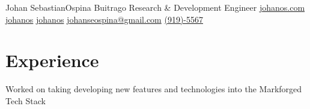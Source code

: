 \documentclass[]{plushcv}
\begin{document}
%
%

\namesection
{Johan Sebastian}{Ospina Buitrago}
{Research \& Development Engineer}
{
    \contactline
    {\href{https://www.johanos.com}{johanos.com}}
    {\href{https://www.github.com/johanos}{johanos}}
    {\href{https://www.linkedin.com/in/johanos}
        {johanos}}
    {\href{mailto:johanseospina@gmail.com}{johanseospina@gmail.com}}
    {\href{tel:+1 (919) 946-5567}{(919)-5567}}
}

%
%

\begin{minipage}[t]{0.70\textwidth}



    \section{Experience}
    \vspace{\topsep} %
    \begin{tightemize}
        \sectionsep
        \item Worked on taking developing new features and technologies into the Markforged Tech Stack
    \end{tightemize}
    \sectionsep


\end{minipage}
\end{document}
